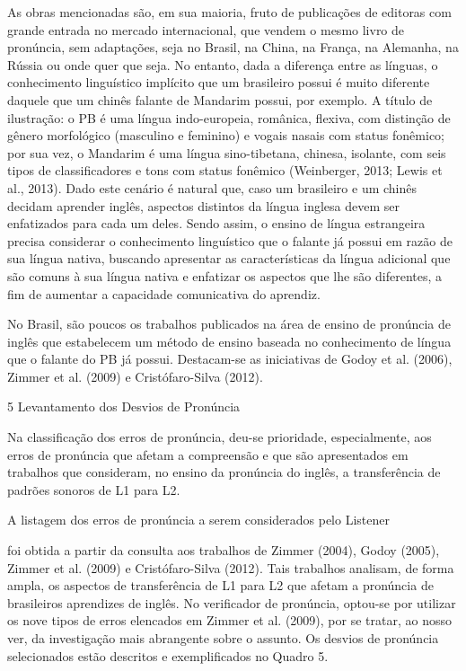 As obras mencionadas s\~ao, em sua  maioria,  fruto  de  publica\c{c}\~oes  de
editoras com grande entrada no mercado internacional, que vendem o mesmo
livro de pron\'uncia, sem adapta\c{c}\~oes, seja no Brasil, na China, na Fran\c{c}a,
na Alemanha, na R\'ussia ou onde quer que seja. No entanto, dada a
diferen\c{c}a entre as l\'inguas, o conhecimento lingu\'istico impl\'icito que um
brasileiro possui \'e muito diferente daquele que um chin\^es falante de
Mandarim possui, por exemplo. A t\'itulo de ilustra\c{c}\~ao: o PB \'e uma l\'ingua
indo-europeia, rom\^anica, flexiva, com distin\c{c}\~ao de g\^enero morfol\'ogico
(masculino e feminino) e vogais nasais com status fon\^emico; por sua vez,
o Mandarim \'e uma l\'ingua sino-tibetana, chinesa, isolante, com seis tipos
de classificadores e tons com status fon\^emico (Weinberger, 2013; Lewis
et al., 2013). Dado este cen\'ario \'e natural que, caso um brasileiro e um
chin\^es decidam aprender ingl\^es, aspectos distintos da l\'ingua inglesa
devem ser enfatizados para cada um deles. Sendo assim, o ensino de
l\'ingua estrangeira precisa considerar o conhecimento lingu\'istico que o
falante j\'a possui em raz\~ao de sua l\'ingua nativa, buscando apresentar as
caracter\'isticas da l\'ingua adicional que s\~ao comuns à sua l\'ingua nativa e
enfatizar os aspectos que lhe s\~ao diferentes, a fim de aumentar a
capacidade comunicativa do aprendiz.

No Brasil, s\~ao poucos os trabalhos publicados na  \'area  de  ensino  de
pron\'uncia de ingl\^es que estabelecem um m\'etodo de ensino baseada no
conhecimento de l\'ingua que o falante do PB j\'a possui. Destacam-se as
iniciativas de Godoy et al. (2006), Zimmer et al. (2009) e
Crist\'ofaro-Silva (2012).

5 Levantamento dos Desvios de Pron\'uncia

Na classifica\c{c}\~ao dos erros de pron\'uncia, deu-se prioridade,
especialmente, aos erros de pron\'uncia que afetam a compreens\~ao e que s\~ao
apresentados em trabalhos que consideram, no ensino da pron\'uncia do
ingl\^es, a transfer\^encia de padr\~oes sonoros de L1 para L2.

  A listagem dos erros de pron\'uncia a serem considerados  pelo  Listener

foi obtida a partir da consulta aos trabalhos de Zimmer (2004), Godoy
(2005), Zimmer et al. (2009) e Crist\'ofaro-Silva (2012). Tais trabalhos
analisam, de forma ampla, os aspectos de transfer\^encia de L1 para L2 que
afetam a pron\'uncia de brasileiros aprendizes de ingl\^es. No verificador
de pron\'uncia, optou-se por utilizar os nove tipos de erros elencados em
Zimmer et al. (2009), por se tratar, ao nosso ver, da investiga\c{c}\~ao mais
abrangente sobre o assunto. Os desvios de pron\'uncia selecionados est\~ao
descritos e exemplificados no Quadro 5.

